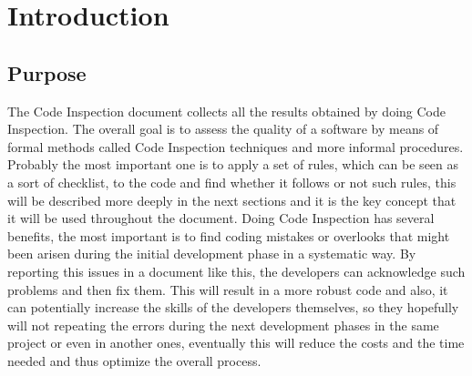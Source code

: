 \break
\section{Introduction}
\subsection{Purpose}
The Code Inspection document collects all the results obtained by doing Code Inspection. The overall goal is to assess the quality of a software by means of formal methods called Code Inspection techniques and more informal procedures. \newline
Probably the most important one is to apply a set of rules, which can be seen as a sort of checklist, to the code and find whether it follows or not such rules, this will be described more deeply in the next sections and it is the key concept that it will be used throughout the document. \newline
Doing Code Inspection has several benefits, the most important is to find coding mistakes or overlooks that might been arisen during the initial development phase in a systematic way. By reporting this issues in a document like this, the developers can acknowledge such problems and then fix them. This will result in a more robust code and also, it can potentially increase the skills of the developers themselves, so they hopefully will not repeating the errors during the next development phases in the same project or even in another ones, eventually this will reduce the costs and the time needed and thus optimize the overall process.
